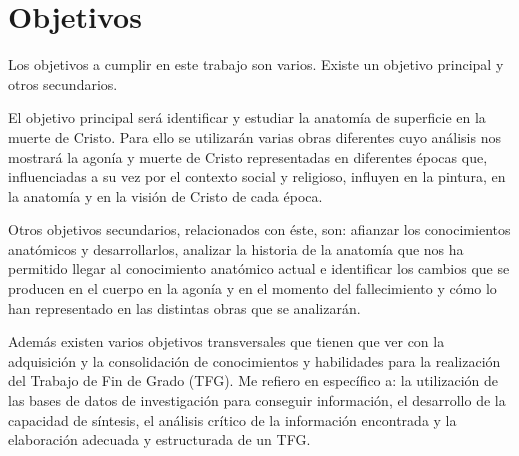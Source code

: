 \section{Objetivos}
Los objetivos a cumplir en este trabajo son varios. Existe un objetivo principal y otros secundarios.

El objetivo principal será identificar y estudiar la anatomía de superficie en la muerte de Cristo. Para ello se utilizarán varias obras diferentes cuyo análisis nos mostrará la agonía y muerte de Cristo representadas en diferentes épocas que, influenciadas a su vez por el contexto social y religioso, influyen en la pintura, en la anatomía y en la visión de Cristo de cada época.

Otros objetivos secundarios, relacionados con éste, son: afianzar los conocimientos anatómicos y desarrollarlos, analizar la historia de la anatomía que nos ha permitido llegar al conocimiento anatómico actual e identificar los cambios que se producen en el cuerpo en la agonía y en el momento del fallecimiento y cómo lo han representado en las distintas obras que se analizarán.

Además existen varios objetivos transversales que tienen que ver con la adquisición y la consolidación de conocimientos y habilidades para la realización del Trabajo de Fin de Grado (TFG). Me refiero en específico a: la utilización de las bases de datos de investigación para conseguir información, el desarrollo de la capacidad de síntesis, el análisis crítico de la información encontrada y la elaboración adecuada y estructurada de un TFG.